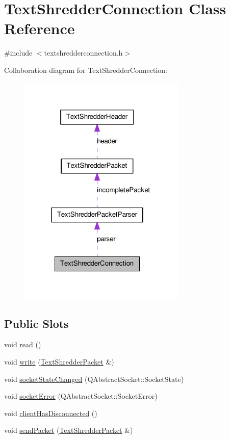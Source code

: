\hypertarget{class_text_shredder_connection}{
\section{TextShredderConnection Class Reference}
\label{class_text_shredder_connection}
}


{\ttfamily \#include $<$textshredderconnection.h$>$}



Collaboration diagram for TextShredderConnection:\nopagebreak
\begin{figure}[H]
\begin{center}
\leavevmode
\includegraphics[width=226pt]{class_text_shredder_connection__coll__graph}
\end{center}
\end{figure}
\subsection*{Public Slots}
\begin{DoxyCompactItemize}
\item 
void \hyperlink{class_text_shredder_connection_af026ddf63817564ba3b494bb3fe63768}{read} ()
\item 
void \hyperlink{class_text_shredder_connection_acf1e4260675c90dde5c2bd9a16907863}{write} (\hyperlink{class_text_shredder_packet}{TextShredderPacket} \&)
\item 
void \hyperlink{class_text_shredder_connection_afe3e646db80ba80b8f64704138e5e2ff}{socketStateChanged} (QAbstractSocket::SocketState)
\item 
void \hyperlink{class_text_shredder_connection_abe32ce5a39cfe11298d6455b077b7d24}{socketError} (QAbstractSocket::SocketError)
\item 
void \hyperlink{class_text_shredder_connection_a77c6bc3f39a96a68a5c1d55914f138a5}{clientHasDisconnected} ()
\item 
void \hyperlink{class_text_shredder_connection_a11e920ba0fc122613d84e70fb018a6a1}{sendPacket} (\hyperlink{class_text_shredder_packet}{TextShredderPacket} \&)
\end{DoxyCompactItemize}
